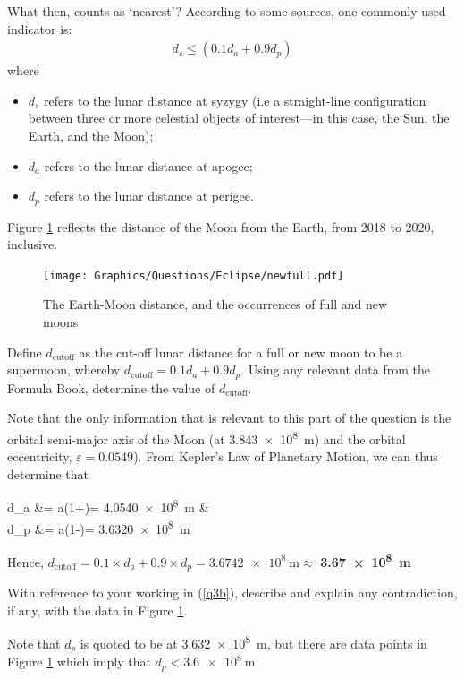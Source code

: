 \documentclass[a4paper,11pt,draft]{exam}
\begin{document}
\begin{questions}
{	What then, counts as `nearest'? According to some sources, one commonly used indicator is:
	\begin{align}
	d_s \leq (0.1d_a + 0.9d_p)
	\end{align}
	where
	\begin{itemize}[leftmargin=10pt]
		\item $ d_s $ refers to the lunar distance at syzygy (i.e a straight-line configuration between three or more celestial objects of interest---in this case, the Sun, the Earth, and the Moon);
		\item $ d_a $ refers to the lunar distance at apogee;
		\item $ d_p $ refers to the lunar distance at perigee.
	\end{itemize}
	Figure \ref{q3} reflects the distance of the Moon from the Earth, from 2018 to 2020, inclusive.
	\begin{figure}[H]
		\centering
		\texttt{[image: Graphics/Questions/Eclipse/newfull.pdf]}
		\renewcommand{\figurename}{Figure}
		\caption{The Earth-Moon distance, and the occurrences of full and new moons}
		\label{q3}
	\end{figure}
	\vspace{-20pt}
}
\question[2]\label{q3b}
	Define $ d_\text{cutoff} $ as the cut-off lunar distance for a full or new moon to be a supermoon, whereby $ d_\text{cutoff} = 0.1d_a + 0.9d_p $. Using any relevant data from the Formula Book, determine the value of $ d_\text{cutoff} $. 
	\droppoints
	\begin{solution}
		Note that the only information that is relevant to this part of the question is the orbital semi-major axis of the Moon (at \SI{3.843e8}{\metre}) and the orbital eccentricity, $ \varepsilon = 0.0549 $).
		From Kepler’s  Law of Planetary Motion, we can thus determine that 
		\begin{flalign*}
			d_a &= a\left(1+\varepsilon\right)= \SI{4.0540e8}{\metre} &\\
			d_p &= a\left(1-\varepsilon\right)= \SI{3.6320e8}{\metre}
		\end{flalign*}
		Hence, $ d_\text{cutoff} = 0.1 \times d_a + 0.9 \times d_p = \SI{3.6742e8}{\metre} \approx $ \textbf{\SI{3.67e8}{\metre}}
	\end{solution}

\question[2]\label{q3c}
	With reference to your working in (\ref{q3b}), describe and explain any contradiction, if any, with the data in Figure \ref{q3}.
	\droppoints
	\begin{solution}
		Note that $ d_p $ is quoted to be at \SI{3.632e8}{\metre}, but there are data points in Figure \ref{q3} which imply that $ d_p < \SI{3.6e8}{\metre}$.
		

\end{solution}
\end{questions}
\end{document}
